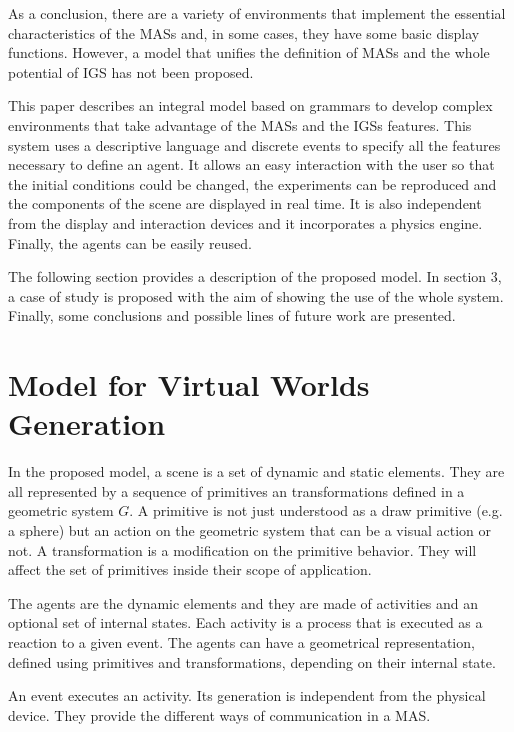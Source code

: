 \documentclass[runningheads]{llncs}
\begin{document}
As a conclusion, there are a variety of environments that implement the essential characteristics
of the MASs and, in some cases, they have some basic display functions. However, a model that
unifies the definition of MASs and the whole potential of IGS has not been proposed.

This paper describes an integral model based on grammars to develop complex environments that take
advantage of the MASs and the IGSs features. This system uses a descriptive language and discrete
events to specify all the features necessary to define an agent. It allows an easy interaction with
the user so that the initial conditions could be changed, the experiments can be reproduced and the
components of the scene are displayed in real time. It is also independent from the display and
interaction devices and it incorporates a physics engine. Finally, the agents can be easily reused.

The following section provides a description of the proposed model. In section 3, a case of study
is proposed with the aim of showing the use of the whole system. Finally, some conclusions and
possible lines of future work are presented.



\section{Model for Virtual Worlds Generation
\label{sec:model}}

In the proposed model, a scene is a set of dynamic and static elements. They are all represented by
a sequence of primitives an transformations defined in a geometric system $G$. A primitive is not
just understood as a draw primitive (e.g. a sphere) but an action on the geometric system that can
be a visual action or not. A transformation is a modification on the primitive behavior. They will
affect the set of primitives inside their scope of application.

The agents are the dynamic elements and they are made of activities and an optional set of internal
states. Each activity is a process that is executed as a reaction to a given event. The agents can
have a geometrical representation, defined using primitives and transformations, depending on their
internal state.

An event executes an activity. Its generation is independent from the physical device. They provide
the different ways of communication in a MAS.
\end{document}
